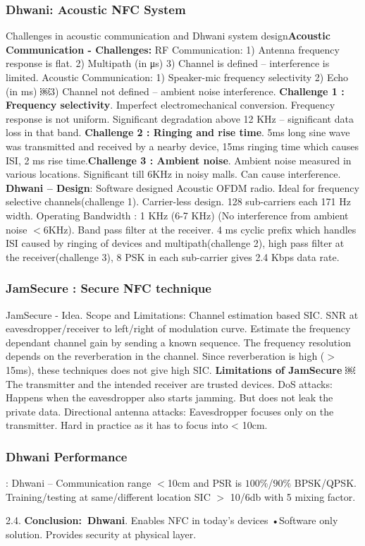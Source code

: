\documentclass[9pt]{extarticle}
\begin{document}
\begin{multicols}{2}
\subsubsection{Dhwani: Acoustic NFC System}

Challenges in acoustic communication and Dhwani system design\textbf{Acoustic Communication - Challenges:} RF Communication: 1) Antenna frequency response is flat. 2) Multipath (in μs) 3) Channel is defined – interference is limited. Acoustic Communication: 1) Speaker-mic frequency selectivity 2) Echo (in ms) ￼3) Channel not defined – ambient noise interference. \textbf{Challenge 1 : Frequency selectivity}. Imperfect electromechanical conversion. Frequency response is not uniform. Significant degradation above 12 KHz – significant data loss in that band. \textbf{Challenge 2 : Ringing and rise time}. 5ms long sine wave was transmitted and received by a nearby device, 15ms ringing time which causes ISI, 2 ms rise time.\textbf{Challenge 3 : Ambient noise}. Ambient noise measured in various locations. Significant till 6KHz in noisy malls. Can cause interference. \textbf{Dhwani – Design}: Software designed Acoustic OFDM radio. Ideal for frequency selective channels(challenge 1). Carrier-less design. 128 sub-carriers each 171 Hz width. Operating Bandwidth : 1 KHz (6-7 KHz) (No interference from ambient noise $<$6KHz). Band pass filter at the receiver. 4 ms cyclic prefix which handles ISI caused by ringing of devices and multipath(challenge 2), high pass filter at the receiver(challenge 3), 8 PSK in each sub-carrier gives 2.4 Kbps data rate.

\subsubsection{JamSecure : Secure NFC technique}

JamSecure - Idea. Scope and Limitations: Channel estimation based SIC. SNR at eavesdropper/receiver to left/right of modulation curve. Estimate the frequency dependant channel gain by sending a known sequence. The frequency resolution depends on the reverberation in the channel. Since reverberation is high ($>$15ms), these techniques does not give high SIC. \textbf{Limitations of JamSecure} ￼The transmitter and the intended receiver are trusted devices.
DoS attacks: Happens when the eavesdropper also starts jamming. But does not leak the private data. Directional antenna attacks: Eavesdropper focuses only on the transmitter. Hard in practice as it has to focus into < 10cm.

\subsubsection{Dhwani Performance}: Dhwani – Communication range $<$10cm and PSR is $100\%$/$90\%$ BPSK/QPSK. Training/testing at same/different location SIC $>$ 10/6db with 5 mixing factor.

2.4. \textbf{Conclusion:\ Dhwani}. Enables NFC in today’s devices •Software only solution. Provides security at physical layer.

\end{multicols}
\end{document}
